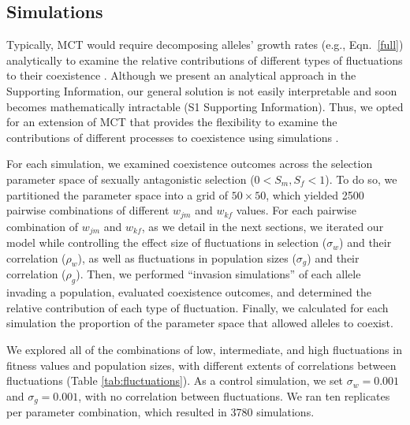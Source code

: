 \documentclass[12pt]{article}
\begin{document}
\subsection*{Simulations}

Typically, MCT would require decomposing alleles' growth rates (e.g., Eqn.~\ref{full}) analytically to examine the relative contributions of different types of fluctuations to their coexistence \citep{barabas_chessons_2018}. Although we present an analytical approach in the Supporting Information, our general solution is not easily interpretable and soon becomes mathematically intractable (S1 Supporting Information). Thus, we opted for an extension of MCT that provides the flexibility to examine the contributions of different processes to coexistence using simulations \citep{ellner_expanded_2019, shoemaker2020}.



For each simulation, we examined coexistence outcomes across the selection parameter space of sexually antagonistic selection ($0 < S_{m}, S_{f} < 1$). To do so, we partitioned the parameter space into a grid of $50 \times 50$, which yielded 2500 pairwise combinations of different $w_{jm}$ and $w_{kf}$ values. For each pairwise combination of $w_{jm}$ and $w_{kf}$, as we detail in the next sections, we iterated our model while controlling the effect size of  fluctuations in selection ($\sigma_{w}$) and their correlation ($\rho_{w}$), as well as fluctuations in population sizes ($\sigma_{g}$) and their correlation ($\rho_{g}$). Then, we performed ``invasion simulations''  of each allele invading a population, evaluated coexistence outcomes, and determined the relative contribution of each type of fluctuation. Finally, we calculated for each simulation the proportion of the parameter space that allowed alleles to coexist.

We explored all of  the combinations of low, intermediate, and high fluctuations  in fitness values and population sizes, with different extents of correlations between fluctuations (Table \ref{tab:fluctuations}).  As a control simulation, we set $\sigma_{w}= 0.001$ and  $\sigma_{g}=0.001$, with no correlation between fluctuations. We ran ten replicates per parameter combination, which resulted in 3780 simulations.
\end{document}
